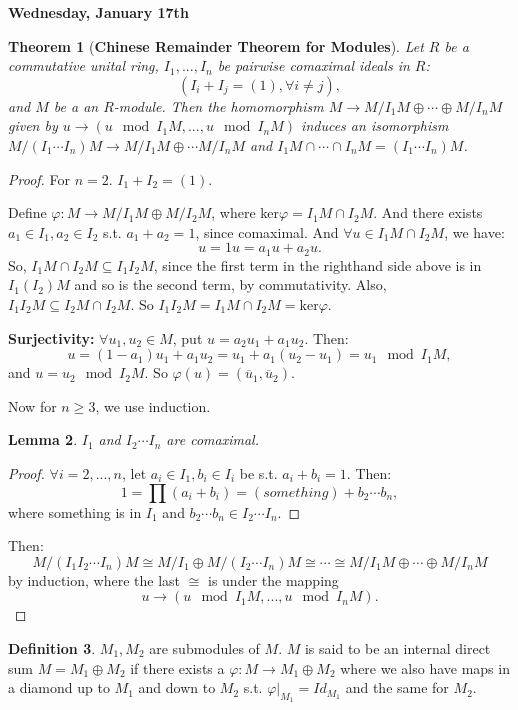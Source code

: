 \documentclass[9pt,reqno,twoside]{amsbook}
\theoremstyle{plain}
\newtheorem{theorem}{Theorem}[chapter]
\numberwithin{section}{chapter}
\numberwithin{equation}{chapter}
\newtheorem{lem}[theorem]{Lemma}
\theoremstyle{definition}
\newtheorem{Def}[theorem]{Definition}
\theoremstyle{remark}
\theoremstyle{plain}
\newcommand{\sub}{\subseteq}
\renewcommand{\geq}{\geqslant}
\renewcommand{\phi}{\varphi}
\begin{document}
\textbf{Wednesday, January 17th}

\begin{theorem}[\textbf{Chinese Remainder Theorem for Modules}]
Let $R$ be a commutative unital ring, $I_1,...,I_n$ be pairwise comaximal ideals in $R$:
$$
(I_i + I_j = (1),\forall i\neq j),
$$
and $M$ be a an $R$-module. Then the homomorphism $M \to M/I_1M \oplus \cdots \oplus M/I_nM$ given by $u \to (u \mod I_1M,...,u \mod I_nM)$ induces an isomorphism $M/(I_1\cdots I_n)M \to M/I_1M \oplus \cdots M/I_nM$ and $I_1M \cap \cdots \cap I_nM = (I_1 \cdots I_n)M$. 
\end{theorem}
\begin{proof}
For $n = 2$. $I_1 + I_2 = (1)$. 

Define $\phi: M \to M/I_1M \oplus M/I_2M$, where ker$\phi = I_1M \cap I_2M$. And there exists $a_1 \in I_1,a_2 \in I_2$ s.t. $a_1 + a_2 = 1$, since comaximal. And $\forall u \in I_1M \cap I_2M$, we have:
$$
u = 1u = a_1u + a_2u.
$$
So, $I_1M \cap I_2M \sub I_1I_2M$, since the first term in the righthand side above is in $I_1(I_2)M$ and so is the second term, by commutativity. Also, $I_1I_2M \sub I_2M \cap I_2M$. So $I_1I_2M = I_1M \cap I_2M = \text{ker}\phi$. 

\textbf{Surjectivity: } $\forall u_1,u_2 \in M$, put $u = a_2u_1 + a_1u_2$. Then:
$$
u = (1 - a_1)u_1  + a_1u_2 = u_1 + a_1(u_2 - u_1) = u_1 \mod I_1M,
$$
and $u = u_2 \mod I_2M$. So $\phi(u) = (\overline{u}_1,\overline{u}_2)$. 

Now for $n \geq 3$, we use induction. 
\begin{lem}
$I_1$ and $I_2\cdots I_n$ are comaximal. 
\end{lem}
\begin{proof}
$\forall i = 2,...,n$, let $a_i \in I_1,b_i \in I_i$ be s.t. $a_i + b_i = 1$. Then:
$$
1 = \prod(a_i + b_i) = (something ) + b_2\cdots b_n,
$$
where something is in $I_1$ and $b_2\cdots b_n \in I_2\cdots I_n$. 
\end{proof}
Then:
$$
M/(I_1I_2 \cdots I_n)M \cong M/I_1 \oplus M/(I_2\cdots I_n)M \cong \cdots \cong M/I_1M \oplus \cdots \oplus M/I_nM
$$
by induction, where the last $\cong$ is under the mapping $$
u \to (u \mod I_1M ,...,u \mod I_nM).
$$
\end{proof}



\begin{Def}
$M_1,M_2$ are submodules of $M$. $M$ is said to be an internal direct sum $M = M_1 \oplus M_2$ if there exists a $\phi: M \to M_1 \oplus M_2$ where we also have maps in a diamond up to $M_1$ and down to $M_2$ s.t. $\phi|_{M_1} = Id_{M_1}$ and the same for $M_2$. 
\end{Def}
\end{document}

